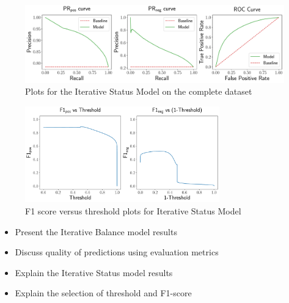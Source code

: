 \begin{figure}[htp]
    \centering
    \includegraphics[width=\textwidth]{images/iterative_Status.pdf}
    \caption{Plots for the Iterative Status Model on the complete \wikirfa dataset}
    \label{fig:complete-iterative-status}
\end{figure}


\begin{figure}[htp]
    \centering
    \includegraphics[width=0.75\textwidth]{images/iterative_Status_f1.pdf}
    \caption{F1 score versus threshold plots for Iterative Status Model}
    \label{fig:complete-iterative-status-f1}
\end{figure}



\begin{itemize}
    \item Present the Iterative Balance model results
    \item Discuss quality of predictions using evaluation metrics
    \item Explain the Iterative Status model results 
    \item Explain the selection of threshold and F1-score
\end{itemize}

